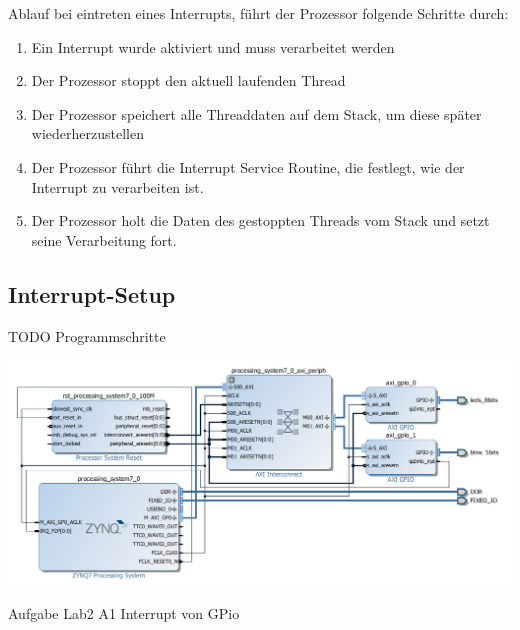 Ablauf bei eintreten eines Interrupts, führt der Prozessor folgende Schritte durch: 
\begin{enumerate}
  \item Ein Interrupt wurde aktiviert und muss verarbeitet werden
  \item Der Prozessor stoppt den aktuell laufenden Thread
  \item Der Prozessor speichert alle Threaddaten auf dem Stack, um diese später wiederherzustellen
  \item Der Prozessor führt die Interrupt Service Routine, die festlegt, wie der Interrupt zu verarbeiten ist.
  \item Der Prozessor holt die Daten des gestoppten Threads vom Stack und setzt seine Verarbeitung fort.
\end{enumerate}

 \subsection{Interrupt-Setup}
 
 TODO Programmschritte
 
 \begin{minipage}{\textwidth}
    \begin{center}        
        \includegraphics[scale=0.58]{img/lab2a1.png} 
    \end{center}
\end{minipage}
\begin{center}
Aufgabe Lab2 A1 Interrupt von GPio
\end{center}
 
 
 
